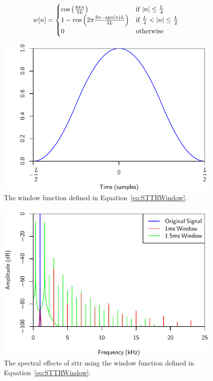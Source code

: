 			\begin{equation}
				w[n] = \begin{cases}
					\cos \left( \frac{4\pi n}{3L} \right) & \text{if $\left|n\right| \leq \frac{L}{4} $} \\
					1 - \cos \left( 2\pi \frac{2n - \operatorname{sgn}(n)L}{3L} \right) &
						\text{if $\frac{L}{4} < \left|n\right| \leq \frac{L}{2}$} \\
					0 & \text{otherwise}
				\end{cases}
				\label{eq:STTRWindow}
			\end{equation}

			\begin{figure}[h!]
				\centering
				\includegraphics{chapter5/Images/STTRWindow.pdf}
				\caption{The window function defined in Equation~\ref{eq:STTRWindow}.}
				\label{fig:STTRWindow}
			\end{figure}

			\begin{figure}[h!]
				\centering
				\includegraphics{chapter5/Images/STTRSpectra.pdf}
				\caption{The spectral effects of \acrshort{sttr} using the window function defined in
					 Equation~\ref{eq:STTRWindow}.}
				\label{fig:STTRSpectra}
			\end{figure}

